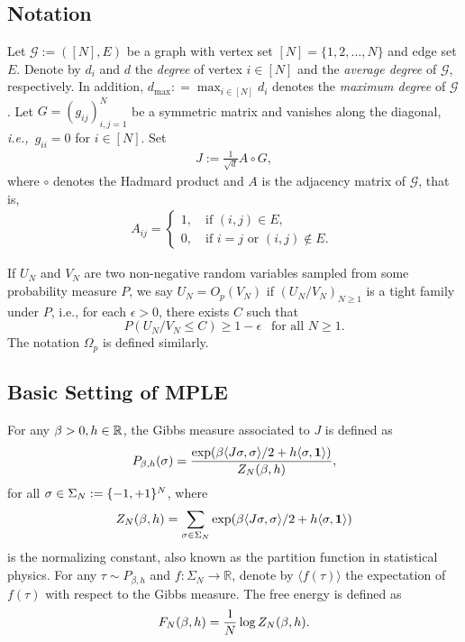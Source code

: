 \documentclass[letterpaper,11pt,reqno]{amsart}
\renewcommand{\le}{\leqslant}
\renewcommand{\ge}{\geqslant}
\newcommand{\ra}{\rangle}
\newcommand{\la}{\langle}
\newcommand{\ie}{\emph{i.e.,}}
\newcommand{\cG}{\mathcal{G}}\newcommand{\cH}{\mathcal{H}}\newcommand{\cI}{\mathcal{I}}
\newcommand{\mv}[1]{\boldsymbol{#1}}\newcommand{\mvinfty}{\boldsymbol{\infty}}\newcommand{\mvzero}{\boldsymbol{0}}
\newcommand{\mvgs}{{\sigma}}
\renewcommand{\odot}{\circ}
\begin{document}
\subsection{Notation}
Let $\cG:=([N], E)$ be a graph with vertex set $[N]=\{1,2,\ldots,N\}$ and edge set $E$. Denote by $d_i$ and $d$ the \emph{degree} of vertex $i\in[N]$ and the \emph{average degree} of $\cG$, respectively. In addition, $d_{\max}: = \max_{i\in[N]} d_i$ denotes the \emph{maximum degree} of $\cG$. Let $G=(g_{ij})_{i,j=1}^N$ be a symmetric matrix and vanishes along the diagonal, \ie~$g_{ii} = 0$ for $i\in[N]$. Set \begin{align}\label{eq:J-form}
    J:= \frac{1}{\sqrt{d}} A \odot G,
\end{align}
where $\circ$ denotes the Hadmard product and 
$A$ is the adjacency matrix of $\cG$, that is,
\begin{align*}
    A_{ij} = \begin{cases}
        1, \quad \text{if $(i,j)\in E$}, \\
        0, \quad \text{if $i=j$ or $(i,j) \notin E$. }
    \end{cases}
\end{align*}

If $U_N$ and  $V_N$ are two non-negative random variables sampled from some probability measure $P$, we say $U_N = O_p(V_N)$ if $(U_N/V_N)_{N \ge 1}$ is a tight family under $P$, i.e., for each $\epsilon>0$, there exists $C$ such that 
\[ P( U_N/ V_N \le C) \ge  1- \epsilon \ \ \text{ for all } N \ge 1. \]
The notation $\Omega_p$ is defined similarly. 

\subsection{Basic Setting of MPLE}
For any $\beta>0, h \in \mathbb{R}$, the Gibbs measure associated to $J$ is defined as
\begin{align}\label{eq:model-def}
    P_{\gb,h}(\mvgs) = \frac{\exp(\gb  \la J\mvgs, \mvgs \ra/2 + h \la \mvgs, \mv1 \ra)}{Z_N(\gb,h)},
\end{align}
for all $\mvgs \in \gS_N:=\{-1,+1\}^N$,
where \[
Z_N(\gb,h)=\sum_{\mvgs \in \gS_N} \exp(\gb   \la J\mvgs, \mvgs \ra/2 + h\la \mvgs, \mv1 \ra)\]
is the normalizing constant, also known as the partition function in statistical physics. For any $\tau\sim P_{\beta,h}$ and $f:\Sigma_N\to\mathbb{R}$, denote by $\la f(\tau)\ra$ the expectation of $f(\tau)$ with respect to the Gibbs measure. The free energy is defined as 
\begin{align}
    F_N(\beta,h) = \frac1N \log Z_N(\beta,h).
\end{align}
\end{document}
